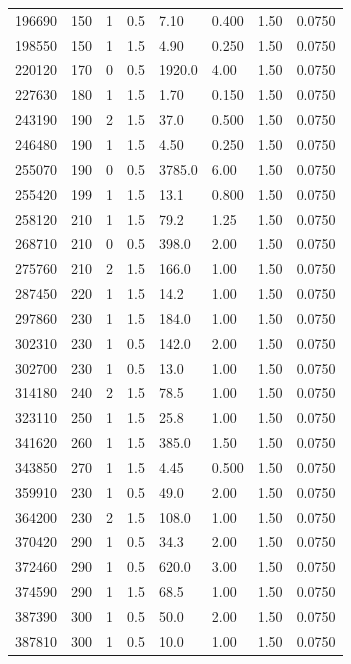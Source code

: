 \documentclass[preview]{standalone}
\begin{document}
{{\begin{tabular}{L{1.2cm}C{1.2cm} C{0.3cm}C{0.5cm} C{1.4cm}C{1.4cm} C{1.4cm}C{1.4cm}}
  196690  &   150  & 1     & 0.5 &  7.10  & 0.400  & 1.50 &  0.0750   \\ 
  198550  &   150  & 1     & 1.5 &  4.90  & 0.250  & 1.50 &  0.0750   \\ 
  220120  &   170  & 0     & 0.5 &  1920.0  & 4.00  & 1.50 &  0.0750   \\ 
  227630  &   180  & 1     & 1.5 &  1.70  & 0.150  & 1.50 &  0.0750   \\ 
  243190  &   190  & 2     & 1.5 &  37.0  & 0.500  & 1.50 &  0.0750   \\ 
  246480  &   190  & 1     & 1.5 &  4.50  & 0.250  & 1.50 &  0.0750   \\ 
  255070  &   190  & 0     & 0.5 &  3785.0  & 6.00  & 1.50 &  0.0750   \\ 
  255420  &   199  & 1     & 1.5 &  13.1  & 0.800  & 1.50 &  0.0750   \\ 
  258120  &   210  & 1     & 1.5 &  79.2  & 1.25  & 1.50 &  0.0750   \\ 
  268710  &   210  & 0     & 0.5 &  398.0  & 2.00  & 1.50 &  0.0750   \\ 
  275760  &   210  & 2     & 1.5 &  166.0  & 1.00  & 1.50 &  0.0750   \\ 
  287450  &   220  & 1     & 1.5 &  14.2  & 1.00  & 1.50 &  0.0750   \\ 
  297860  &   230  & 1     & 1.5 &  184.0  & 1.00  & 1.50 &  0.0750   \\ 
  302310  &   230  & 1     & 0.5 &  142.0  & 2.00  & 1.50 &  0.0750   \\ 
  302700  &   230  & 1     & 0.5 &  13.0  & 1.00  & 1.50 &  0.0750   \\ 
  314180  &   240  & 2     & 1.5 &  78.5  & 1.00  & 1.50 &  0.0750   \\ 
  323110  &   250  & 1     & 1.5 &  25.8  & 1.00  & 1.50 &  0.0750   \\ 
  341620  &   260  & 1     & 1.5 &  385.0  & 1.50  & 1.50 &  0.0750   \\ 
  343850  &   270  & 1     & 1.5 &  4.45  & 0.500  & 1.50 &  0.0750   \\ 
  359910  &   230  & 1     & 0.5 &  49.0  & 2.00  & 1.50 &  0.0750   \\ 
  364200  &   230  & 2     & 1.5 &  108.0  & 1.00  & 1.50 &  0.0750   \\ 
  370420  &   290  & 1     & 0.5 &  34.3  & 2.00  & 1.50 &  0.0750   \\ 
  372460  &   290  & 1     & 0.5 &  620.0  & 3.00  & 1.50 &  0.0750   \\ 
  374590  &   290  & 1     & 1.5 &  68.5  & 1.00  & 1.50 &  0.0750   \\ 
  387390  &   300  & 1     & 0.5 &  50.0  & 2.00  & 1.50 &  0.0750   \\ 
  387810  &   300  & 1     & 0.5 &  10.0  & 1.00  & 1.50 &  0.0750   \\ 
\hline 
\end{tabular} 

}}
\end{document}
